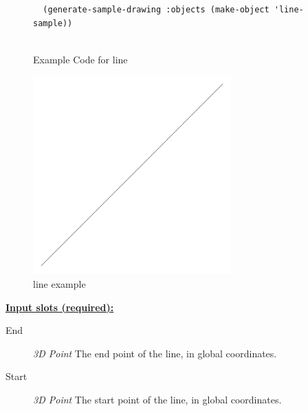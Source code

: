 \documentclass [11pt]{book}
\begin{document}
\begin{itemize}
\begin{figure}
\begin{lrbox}{\boxedverb}
\begin{minipage}{\linewidth}
{\begin{verbatim}
  (generate-sample-drawing :objects (make-object 'line-sample))
  

\end{verbatim}}
\end{minipage}
\end{lrbox}
\fbox{\usebox{\boxedverb}}

\caption{Example Code for line}

\label{fig:example-code-line}

\end{figure}

\begin{figure}
\begin{center}
\includegraphics[width=3in,height=3in]{../images/example-line.pdf}
\end{center}

\caption{line example}

\label{fig:line}

\end{figure}





\textbf{
\underline{Input slots (required):}}

\begin{description}

\item [End]
\emph{3D Point} The end point of the line, in global coordinates.


\item [Start]
\emph{3D Point} The start point of the line, in global coordinates.


\end{description}







\end{itemize}
\end{document}
